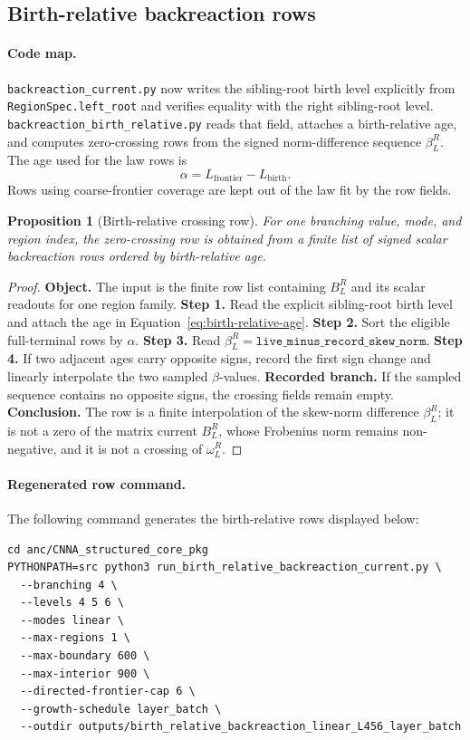 \documentclass[11pt]{article}
\newtheorem{proposition}[definition]{Proposition}
\theoremstyle{remark}
\newcommand{\code}[1]{\texttt{#1}}
\numberwithin{equation}{section}
\begin{document}
\subsection{Birth-relative backreaction rows}
\paragraph{Code map.} \code{backreaction\_\allowbreak{}current.py} now writes the sibling-root birth level explicitly from \code{RegionSpec.left\_root} and verifies equality with the right sibling-root level. \code{backreaction\_\allowbreak{}birth\_\allowbreak{}relative.py} reads that field, attaches a birth-relative age, and computes zero-crossing rows from the signed norm-difference sequence \(\beta_L^R\). The age used for the law rows is
\begin{equation}
  \alpha=L_{\mathrm{frontier}}-L_{\mathrm{birth}}.
  \label{eq:birth-relative-age}
\end{equation}
Rows using coarse-frontier coverage are kept out of the law fit by the row fields.

\begin{proposition}[Birth-relative crossing row]
For one branching value, mode, and region index, the zero-crossing row is obtained from a finite list of signed scalar backreaction rows ordered by birth-relative age.
\end{proposition}
\begin{proof}
\textbf{Object.} The input is the finite row list containing \(B_L^R\) and its scalar readouts for one region family. \textbf{Step 1.} Read the explicit sibling-root birth level and attach the age in Equation~\eqref{eq:birth-relative-age}. \textbf{Step 2.} Sort the eligible full-terminal rows by \(\alpha\). \textbf{Step 3.} Read \(\beta_L^R=\code{live\_minus\_record\_skew\_norm}\). \textbf{Step 4.} If two adjacent ages carry opposite signs, record the first sign change and linearly interpolate the two sampled \(\beta\)-values. \textbf{Recorded branch.} If the sampled sequence contains no opposite signs, the crossing fields remain empty. \textbf{Conclusion.} The row is a finite interpolation of the skew-norm difference \(\beta_L^R\); it is not a zero of the matrix current \(B_L^R\), whose Frobenius norm remains non-negative, and it is not a crossing of \(\omega_L^R\).
\end{proof}

\paragraph{Regenerated row command.}
The following command generates the birth-relative rows displayed below:
\begin{verbatim}
cd anc/CNNA_structured_core_pkg
PYTHONPATH=src python3 run_birth_relative_backreaction_current.py \
  --branching 4 \
  --levels 4 5 6 \
  --modes linear \
  --max-regions 1 \
  --max-boundary 600 \
  --max-interior 900 \
  --directed-frontier-cap 6 \
  --growth-schedule layer_batch \
  --outdir outputs/birth_relative_backreaction_linear_L456_layer_batch
\end{verbatim}
\end{document}
